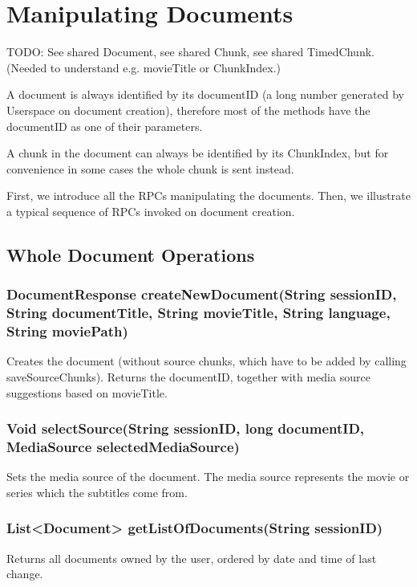 \section{Manipulating Documents}
\label{sec:rpc:doc}

TODO: See shared Document, see shared Chunk, see shared TimedChunk.
(Needed to understand e.g. movieTitle or ChunkIndex.)

A document is always identified by its documentID (a long number generated by Userspace on document creation), therefore most of the methods have the documentID as one of their parameters.

A chunk in the document can always be identified by its ChunkIndex, but for convenience in some cases the whole chunk is sent instead.

First, we introduce all the RPCs manipulating the documents. Then, we illustrate a typical sequence of RPCs invoked on document creation.

\subsection{Whole Document Operations}

\subsubsection{DocumentResponse createNewDocument(String sessionID, String documentTitle, String movieTitle, String language, String moviePath)}

Creates the document
(without source chunks, which have to be added by calling saveSourceChunks).
Returns the documentID, together with media source suggestions based on movieTitle.
     	
\subsubsection{Void selectSource(String sessionID, long documentID, MediaSource selectedMediaSource)}
Sets the media source of the document. The media source represents the movie or series which the subtitles come from.

\subsubsection{List<Document> getListOfDocuments(String sessionID)}
Returns all documents owned by the user, ordered by date and time of last change.

